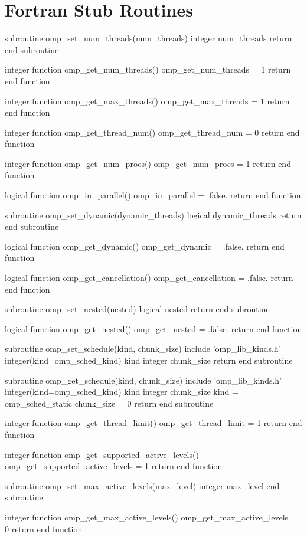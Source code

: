 \section{Fortran Stub Routines}
\label{sec:Fortran Stub Routines}
{\small \begin{ompfFunction}
subroutine omp_set_num_threads(num_threads)
  integer num_threads
  return
end subroutine

integer function omp_get_num_threads()
  omp_get_num_threads = 1
  return
end function

integer function omp_get_max_threads()
  omp_get_max_threads = 1
  return
end function

integer function omp_get_thread_num()
  omp_get_thread_num = 0
  return
end function

integer function omp_get_num_procs()
  omp_get_num_procs = 1
  return
end function

logical function omp_in_parallel()
  omp_in_parallel = .false.
  return
end function

subroutine omp_set_dynamic(dynamic_threads)
  logical dynamic_threads
  return
end subroutine

logical function omp_get_dynamic()
  omp_get_dynamic = .false.
  return
end function

logical function omp_get_cancellation()
  omp_get_cancellation = .false.
  return
end function

subroutine omp_set_nested(nested)
  logical nested
  return
end subroutine

logical function omp_get_nested()
  omp_get_nested = .false.
  return
end function

subroutine omp_set_schedule(kind, chunk_size)
  include 'omp_lib_kinds.h'
  integer(kind=omp_sched_kind) kind
  integer chunk_size
  return
end subroutine

subroutine omp_get_schedule(kind, chunk_size)
  include 'omp_lib_kinds.h'
  integer(kind=omp_sched_kind) kind
  integer chunk_size
  kind = omp_sched_static
  chunk_size = 0
  return
end subroutine

integer function omp_get_thread_limit()
  omp_get_thread_limit = 1
  return
end function

integer function omp_get_supported_active_levels()
  omp_get_supported_active_levels = 1
  return
end function

subroutine omp_set_max_active_levels(max_level)
  integer max_level
end subroutine

integer function omp_get_max_active_levels()
  omp_get_max_active_levels = 0
  return
end function


\end{ompfFunction}}
